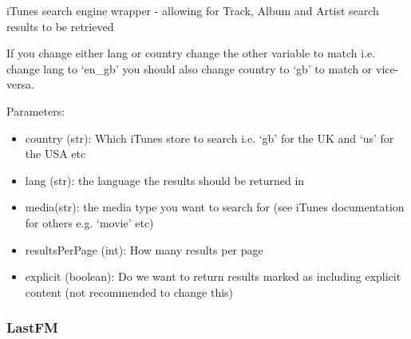 \documentclass[letterpaper,10pt,english]{sphinxmanual}
\begin{document}
\begin{fulllineitems}
\label{api2.0:puppy.search.engine.ITunes}
iTunes search engine wrapper - allowing for Track, Album and Artist search results to be retrieved

If you change either lang or country change the other variable to match i.e. change lang to `en\_gb' you should also change
country to `gb' to match or vice-versa.

Parameters:
\begin{itemize}
\item {} 
country (str): Which iTunes store to search i.e. `gb' for the UK and `us' for the USA etc

\item {} 
lang (str): the language the results should be returned in

\item {} 
media(str): the media type you want to search for (see iTunes documentation for others e.g. `movie' etc)

\item {} 
resultsPerPage (int): How many results per page

\item {} 
explicit (boolean): Do we want to return results marked as including explicit content (not recommended to change this)

\end{itemize}

\end{fulllineitems}



\subsubsection{LastFM}
\label{api2.0:lastfm}
\end{document}
